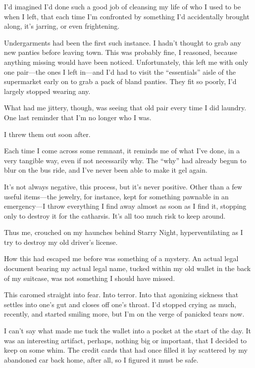 \secdiv{}

\noindent I'd imagined I'd done such a good job of cleansing my life of who I used to be when I left, that each time I'm confronted by something I'd accidentally brought along, it's jarring, or even frightening.

Undergarments had been the first such instance. I hadn't thought to grab any new panties before leaving town. This was probably fine, I reasoned, because anything missing would have been noticed. Unfortunately, this left me with only one pair---the ones I left in---and I'd had to visit the ``essentials'' aisle of the supermarket early on to grab a pack of bland panties. They fit so poorly, I'd largely stopped wearing any.

What had me jittery, though, was seeing that old pair every time I did laundry. One last reminder that I'm no longer who I was.

I threw them out soon after.

Each time I come across some remnant, it reminds me of what I've done, in a very tangible way, even if not necessarily why. The ``why'' had already begun to blur on the bus ride, and I've never been able to make it gel again.

It's not always negative, this process, but it's never positive. Other than a few useful items---the jewelry, for instance, kept for something pawnable in an emergency---I throw everything I find away almost as soon as I find it, stopping only to destroy it for the catharsis. It's all too much risk to keep around.

Thus me, crouched on my haunches behind Starry Night, hyperventilating as I try to destroy my old driver's license.

How this had escaped me before was something of a mystery. An actual legal document bearing my actual legal name, tucked within my old wallet in the back of my suitcase, was not something I should have missed.

This caromed straight into fear. Into terror. Into that agonizing sickness that settles into one's gut and closes off one's throat. I'd stopped crying as much, recently, and started smiling more, but I'm on the verge of panicked tears now.

I can't say what made me tuck the wallet into a pocket at the start of the day. It was an interesting artifact, perhaps, nothing big or important, that I decided to keep on some whim. The credit cards that had once filled it lay scattered by my abandoned car back home, after all, so I figured it must be safe.

